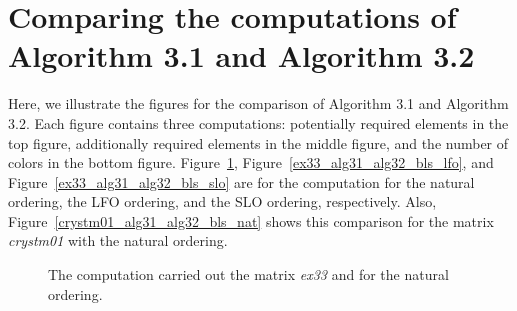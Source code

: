 \documentclass[12pt, twoside,a4paper,toc=bibliography]{scrbook}
\newcommand{\figref}[1]{Figure~\protect\ref{#1}}
\begin{document}
\section{Comparing the computations of Algorithm 3.1 and Algorithm 3.2}
\label{app.compare.alg31.alg32}
Here, we illustrate the figures for the comparison of Algorithm 3.1 and Algorithm 3.2.
Each figure contains three computations: potentially required elements in the top figure,
additionally required elements in the middle figure, and the number of colors in the bottom figure.
\figref{ex33_alg31_alg32_bls_nat}, \figref{ex33_alg31_alg32_bls_lfo},
and \figref{ex33_alg31_alg32_bls_slo} are for the computation for the natural ordering,
the LFO ordering, and the SLO ordering, respectively.
Also, \figref{crystm01_alg31_alg32_bls_nat} shows this comparison for the matrix \textit{crystm01}
with the natural ordering.
\begin{figure}
\caption{The computation carried out the matrix \textit{ex33} and for the natural ordering.}
\label{ex33_alg31_alg32_bls_nat}
\end{figure}
\end{document}
